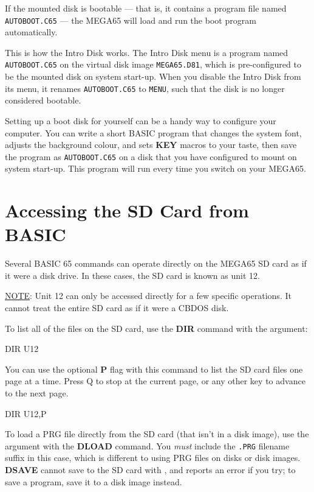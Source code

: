 If the mounted disk is bootable --- that is, it contains a program file named {\tt AUTOBOOT.C65} --- the MEGA65 will load and run the boot program automatically.

This is how the Intro Disk works. The Intro Disk menu is a program named {\tt AUTOBOOT.C65} on the virtual disk image {\tt MEGA65.D81}, which is pre-configured to be the mounted disk on system start-up. When you disable the Intro Disk from its menu, it renames {\tt AUTOBOOT.C65} to {\tt MENU}, such that the disk is no longer considered bootable.

Setting up a boot disk for yourself can be a handy way to configure your computer. You can write a short BASIC program that changes the system font, adjusts the background colour, and sets {\bf KEY} macros to your taste, then save the program as {\tt AUTOBOOT.C65} on a disk that you have configured to mount on system start-up. This program will run every time you switch on your MEGA65.


\section{Accessing the SD Card from BASIC}

Several BASIC 65 commands can operate directly on the MEGA65 SD card as if it were a disk drive. In these cases, the SD card is known as unit 12.

\underline{NOTE}: Unit 12 can only be accessed directly for a few specific operations. It cannot treat the entire SD card as if it were a CBDOS disk.

To list all of the files on the SD card, use the {\bf DIR} command with the  argument:

\begin{screencode}
DIR U12
\end{screencode}

You can use the optional {\bf P} flag with this command to list the SD card files one page at a time. Press Q to stop at the current page, or any other key to advance to the next page.

\begin{screencode}
DIR U12,P
\end{screencode}

To load a PRG file directly from the SD card (that isn't in a disk image), use the  argument with the {\bf DLOAD} command. You {\em must} include the {\tt .PRG} filename suffix in this case, which is different to using PRG files on disks or disk images. {\bf DSAVE} cannot save to the SD card with , and reports an error if you try; to save a program, save it to a disk image instead.

